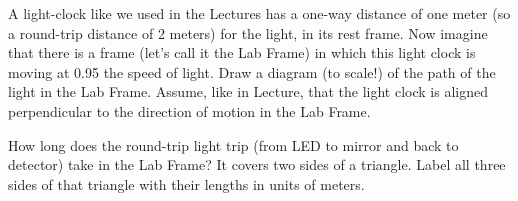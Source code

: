 \documentclass[12pt, letterpaper]{article}
\begin{document}
\begin{problem}
A light-clock like we used in the Lectures has a one-way distance of
one meter (so a round-trip distance of 2 meters) for the light, in its
rest frame. Now imagine that there is a frame (let's call it the Lab
Frame) in which this light clock is moving at 0.95 the speed of
light. Draw a diagram (to scale!) of the path of the light in the Lab
Frame. Assume, like in Lecture, that the light clock is aligned
perpendicular to the direction of motion in the Lab Frame.

How long does the round-trip light trip (from LED to mirror and back
to detector) take in the Lab Frame? It covers two sides of a
triangle. Label all three sides of that triangle with their lengths in
units of meters.
\end{problem}
\end{document}
